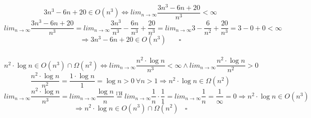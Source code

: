 \documentclass{article}
\begin{document}
\subsubsection{}
\[
	3n^3-6n+20 \in O(n^3) \Leftrightarrow lim_{n\rightarrow\infty}\frac{3n^3-6n+20}{n^3} < \infty
\]
\[
	lim_{n\rightarrow\infty}\frac{3n^3-6n+20}{n^3} = lim_{n\rightarrow\infty} \frac{3n^3}{n^3}-\frac{6n}{n^3}+\frac{20}{n^3}=lim_{n\rightarrow\infty}3-\frac{6}{n^2}+\frac{20}{n^3}=3-0+0<\infty
\]
\[
	\Rightarrow 3n^3-6n+20 \in O(n^3)  ~~~~~~~~\square
\]
\subsubsection{}
\[
	n^2 \cdot \operatorname{log} n \in O(n^3) \cap \Omega(n^2) \Leftrightarrow lim_{n\rightarrow\infty} \frac{n^2 \cdot \operatorname{log} n}{n^3} < \infty \land lim_{n\rightarrow\infty} \frac{n^2 \cdot \operatorname{log} n}{n^2} > 0
\]
\[
	\frac{n^2 \cdot \operatorname{log} n}{n^2} = \frac{1 \cdot \operatorname{log} n}{1} = \operatorname{log} n > 0~ \forall n > 1 \Rightarrow n^2 \cdot \operatorname{log} n \in \Omega(n^2)
\]
\[
	lim_{n\rightarrow\infty} \frac{n^2 \cdot \operatorname{log} n}{n^3} = lim_{n\rightarrow\infty} \frac{\operatorname{log} n}{n} \overset{\text{l'H}}{=} lim_{n\rightarrow\infty}\frac{1}{n} \cdot \frac{1}{1} = lim_{n\rightarrow\infty} \frac{1}{n} = \frac{1}{\infty} = 0 \Rightarrow n^2\cdot\operatorname{log} n \in  O(n^3)
\]
\[
	\Rightarrow n^2 \cdot \operatorname{log} n \in O(n^3) \cap \Omega(n^2)~~~~\square
\]
\end{document}
